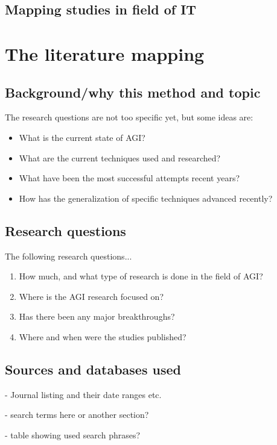 \documentclass[utf8,english]{gradu3}
\begin{document}
\section{Mapping studies in field of IT}

\chapter{The literature mapping}

\section{Background/why this method and topic}
The research questions are not too specific yet, but some ideas are:
\begin{itemize}
    \item What is the current state of AGI?
    \item What are the current techniques used and researched?
    \item What have been the most successful attempts recent years?
    \item How has the generalization of specific techniques advanced recently?
\end{itemize}

\section{Research questions}

The following research questions...


\begin{enumerate}
  \item How much, and what type of research is done in the field of AGI?
  \item Where is the AGI research focused on?
  \item Has there been any major breakthroughs?
  \item Where and when were the studies published?
\end{enumerate}

\section{Sources and databases used}
- Journal listing and their date ranges etc.

- search terms here or another section? 

- table showing used search phrases?
\end{document}
